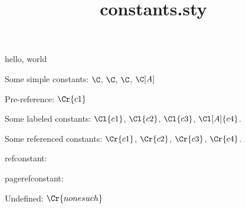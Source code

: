 \documentclass{amsart}
\title{constants.sty}
\begin{document}
\maketitle

hello, world


Some simple constants: $\C$, $\C$, $\C$, $\C[A]$

Pre-reference: $\Cr{c1}$

Some labeled constants: $\Cl{c1}$, $\Cl{c2}$, $\Cl{c3}$, $\Cl[A]{c4}$.

Some referenced constants: $\Cr{c1}$, $\Cr{c2}$, $\Cr{c3}$, $\Cr{c4}$.

refconstant: 

pagerefconstant: 

Undefined: $\Cr{nonesuch}$
\end{document}
